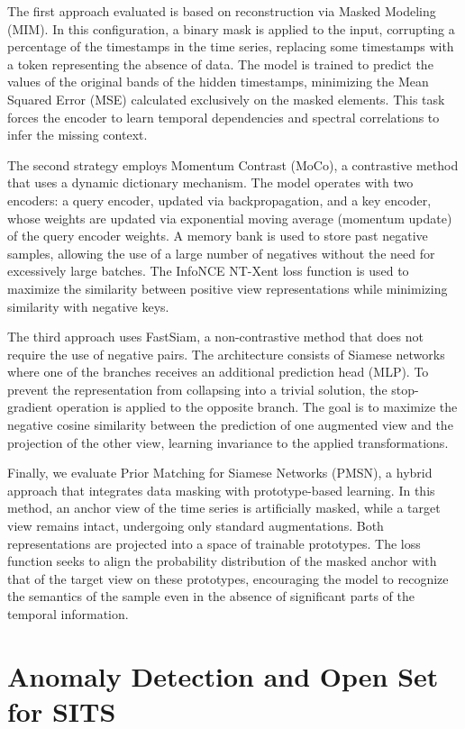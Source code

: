 The first approach evaluated is based on reconstruction via Masked Modeling (MIM). In this configuration, a binary mask is applied to the input, corrupting a percentage of the timestamps in the time series, replacing some timestamps with a token representing the absence of data. The model is trained to predict the values of the original bands of the hidden timestamps, minimizing the Mean Squared Error (MSE) calculated exclusively on the masked elements. This task forces the encoder to learn temporal dependencies and spectral correlations to infer the missing context.

The second strategy employs Momentum Contrast (MoCo), a contrastive method that uses a dynamic dictionary mechanism. The model operates with two encoders: a query encoder, updated via backpropagation, and a key encoder, whose weights are updated via exponential moving average (momentum update) of the query encoder weights. A memory bank is used to store past negative samples, allowing the use of a large number of negatives without the need for excessively large batches. The InfoNCE NT-Xent loss function is used to maximize the similarity between positive view representations while minimizing similarity with negative keys.

The third approach uses FastSiam, a non-contrastive method that does not require the use of negative pairs. The architecture consists of Siamese networks where one of the branches receives an additional prediction head (MLP). To prevent the representation from collapsing into a trivial solution, the stop-gradient operation is applied to the opposite branch. The goal is to maximize the negative cosine similarity between the prediction of one augmented view and the projection of the other view, learning invariance to the applied transformations.

Finally, we evaluate Prior Matching for Siamese Networks (PMSN), a hybrid approach that integrates data masking with prototype-based learning. In this method, an anchor view of the time series is artificially masked, while a target view remains intact, undergoing only standard augmentations. Both representations are projected into a space of trainable prototypes. The loss function seeks to align the probability distribution of the masked anchor with that of the target view on these prototypes, encouraging the model to recognize the semantics of the sample even in the absence of significant parts of the temporal information.

\section{Anomaly Detection and Open Set for SITS}
\label{sec:models_anomaly}

